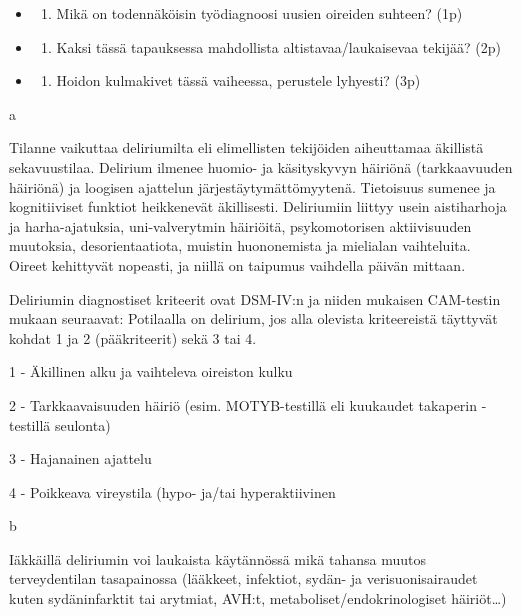 \documentclass[
]{book}
\providecommand{\tightlist}{%
  \setlength{\itemsep}{0pt}\setlength{\parskip}{0pt}}
\begin{document}
\begin{itemize}
\tightlist
\item
  \begin{enumerate}
  \def\labelenumi{\alph{enumi}.}
  \tightlist
  \item
    Mikä on todennäköisin työdiagnoosi uusien oireiden suhteen? (1p)
  \end{enumerate}
\item
  \begin{enumerate}
  \def\labelenumi{\alph{enumi}.}
  \setcounter{enumi}{1}
  \tightlist
  \item
    Kaksi tässä tapauksessa mahdollista altistavaa/laukaisevaa tekijää? (2p)
  \end{enumerate}
\item
  \begin{enumerate}
  \def\labelenumi{\alph{enumi}.}
  \setcounter{enumi}{2}
  \tightlist
  \item
    Hoidon kulmakivet tässä vaiheessa, perustele lyhyesti? (3p)
  \end{enumerate}
\end{itemize}

a

Tilanne vaikuttaa deliriumilta eli elimellisten tekijöiden aiheuttamaa äkillistä sekavuustilaa. Delirium ilmenee huomio- ja käsityskyvyn häiriönä (tarkkaavuuden häiriönä) ja loogisen ajattelun järjestäytymättömyytenä. Tietoisuus sumenee ja kognitiiviset funktiot heikkenevät äkillisesti. Deliriumiin liittyy usein aistiharhoja ja harha-ajatuksia, uni-valverytmin häiriöitä, psykomotorisen aktiivisuuden muutoksia, desorientaatiota, muistin huononemista ja mielialan vaihteluita. Oireet kehittyvät nopeasti, ja niillä on taipumus vaihdella päivän mittaan.

Deliriumin diagnostiset kriteerit ovat DSM-IV:n ja niiden mukaisen CAM-testin mukaan seuraavat: Potilaalla on delirium, jos alla olevista kriteereistä täyttyvät kohdat 1 ja 2 (pääkriteerit) sekä 3 tai 4.

1 - Äkillinen alku ja vaihteleva oireiston kulku

2 - Tarkkaavaisuuden häiriö (esim. MOTYB-testillä eli kuukaudet takaperin -testillä seulonta)

3 - Hajanainen ajattelu

4 - Poikkeava vireystila (hypo- ja/tai hyperaktiivinen

b

Iäkkäillä deliriumin voi laukaista käytännössä mikä tahansa muutos terveydentilan tasapainossa (lääkkeet, infektiot, sydän- ja verisuonisairaudet kuten sydäninfarktit tai arytmiat, AVH:t, metaboliset/endokrinologiset häiriöt\ldots)
\end{document}
